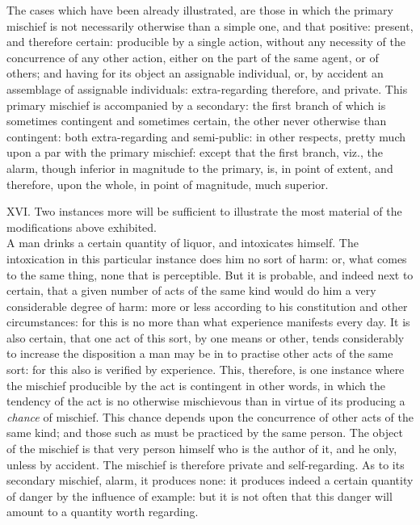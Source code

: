\documentclass[12pt]{report}
\begin{document}
The cases which have been already illustrated, are those in which the
primary mischief is not necessarily otherwise than a simple one, and
that positive: present, and therefore certain: producible by a single
action, without any necessity of the concurrence of any other action,
either on the part of the same agent, or of others; and having for its
object an assignable individual, or, by accident an assemblage of
assignable individuals: extra-regarding therefore, and private. This
primary mischief is accompanied by a secondary: the first branch of
which is sometimes contingent and sometimes certain, the other never
otherwise than contingent: both extra-regarding and semi-public: in
other respects, pretty much upon a par with the primary mischief: except
that the first branch, viz., the alarm, though inferior in magnitude to
the primary, is, in point of extent, and therefore, upon the whole, in
point of magnitude, much superior.

XVI. Two instances more will be sufficient to illustrate the most
material of the modifications above exhibited.\\
A man drinks a certain quantity of liquor, and intoxicates himself. The
intoxication in this particular instance does him no sort of harm: or,
what comes to the same thing, none that is perceptible. But it is
probable, and indeed next to certain, that a given number of acts of the
same kind would do him a very considerable degree of harm: more or less
according to his constitution and other circumstances: for this is no
more than what experience manifests every day. It is also certain, that
one act of this sort, by one means or other, tends considerably to
increase the disposition a man may be in to practise other acts of the
same sort: for this also is verified by experience. This, therefore, is
one instance where the mischief producible by the act is contingent in
other words, in which the tendency of the act is no otherwise
mischievous than in virtue of its producing a \emph{chance} of mischief.
This chance depends upon the concurrence of other acts of the same kind;
and those such as must be practiced by the same person. The object of
the mischief is that very person himself who is the author of it, and he
only, unless by accident. The mischief is therefore private and
self-regarding. As to its secondary mischief, alarm, it produces none:
it produces indeed a certain quantity of danger by the influence of
example: but it is not often that this danger will amount to a quantity
worth regarding.
\end{document}
